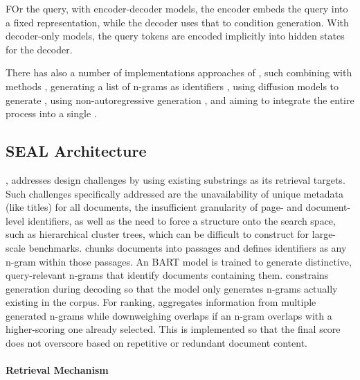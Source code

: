 FOr the query, with encoder-decoder models, the encoder embeds the query into a fixed representation, while the decoder uses that to condition  generation. With decoder-only models, the query tokens are encoded implicitly into hidden states for the decoder. %

There has also a number of implementations approaches of , such combining  with  methods \cite{peiwen-yuan-generative-dense}, generating a list of n-grams as identifiers \cite{michele-bevilacqua-autoregressive-search,yongqi-li-multiview-identifiers}, using diffusion models to generate  \cite{xinpeng-zhao-diffugr-generative,qiao-diffusionret-diffusionenhanced}, %
using non-autoregressive generation \cite{ravisri-valluri-scaling-the,xinpeng-zhao-diffugr-generative}, and aiming to integrate the entire  process into a single  \cite{qiaoyu-tang-selfretrieval-endtoend}.

\subsection{SEAL Architecture}

 \cite{michele-bevilacqua-autoregressive-search}, addresses  design challenges by using existing substrings as its retrieval targets. Such challenges specifically addressed are the unavailability of unique metadata (like titles) for all documents, the insufficient granularity of page- and document-level identifiers, as well as the need to force a structure onto the search space, such as hierarchical cluster trees, which can be difficult to construct for large-scale benchmarks. %
 chunks documents into passages and defines identifiers as any n-gram within those passages. An BART model is trained to generate distinctive, query-relevant n-grams that identify documents containing them.  constrains generation during decoding so that the model only generates n-grams actually existing in the corpus. For ranking,  aggregates information from multiple generated n-grams while downweighing overlaps if an n-gram overlaps with a higher-scoring one already selected. This is implemented so that the final score does not overscore based on repetitive or redundant document content.

\paragraph{Retrieval Mechanism}


